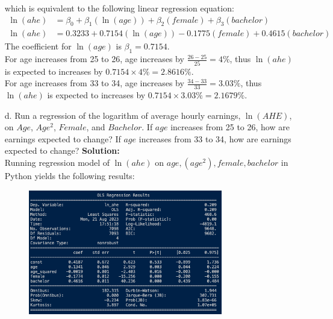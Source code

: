 \documentclass{uofa-eng-assignment}
\begin{document}
\begin{enumerate}
\begin{figure}[H]
        \end{figure}
        which is equivalent to the following linear regression equation:
        \begin{align*}
            \ln{(ahe)} & = \beta_0 + \beta_1 (\ln{(age)}) + \beta_2 (female) + \beta_3 (bachelor) \\
            \ln{(ahe)} & = 0.3233 + 0.7154 (\ln{(age)}) - 0.1775 (female) + 0.4615 (bachelor)
        \end{align*}
        The coefficient for $\ln{(age)}$ is $\beta_1 = 0.7154$. \\
        For age increases from 25 to 26, age increases by $\frac{26 - 25}{25} = 4\%$, thus $\ln{(ahe)}$ is expected to increases by $0.7154 \times 4\% = \boldsymbol{2.8616\%}$. \\
        For age increases from 33 to 34, age increases by $\frac{34 - 33}{33} = 3.03\%$, thus $\ln{(ahe)}$ is expected to increases by $0.7154 \times 3.03\% = \boldsymbol{2.1679\%}$. \\
    \item[d.] Run a regression of the logarithm of average hourly earnings, $\ln{(AHE)}$,
        on $Age$, $Age^2$, $Female$, and $Bachelor$. If $age$ increases from 25 to 26,
        how are earnings expected to change? If $age$ increases from 33 to 34, how are
        earnings expected to change? \newpage \textbf{Solution:} \\ Running regression
        model of $\ln{(ahe)}$ on $age, (age^2), female, bachelor$ in Python yields the
        following results:
        \begin{figure}[H]
            \centering
            \includegraphics[width=0.80\textwidth]{final-exam-d-1.png}

\end{figure}
\end{enumerate}
\end{document}
